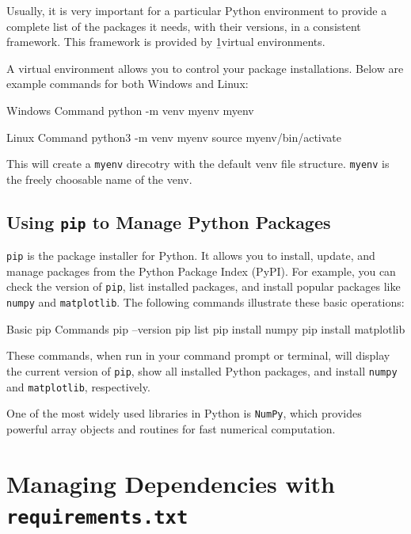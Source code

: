 Usually, it is very important for a particular Python environment to provide a complete list of the packages it needs, with their versions, in a consistent framework. This framework is provided by \b1{virtual environments}.

A virtual environment allows you to control your package installations. Below are example commands for both Windows and Linux:

\begin{codeonly}{Windows Command}
python -m venv myenv
myenv\Scripts\activate
\end{codeonly}

\begin{codeonly}{Linux Command}
python3 -m venv myenv
source myenv/bin/activate
\end{codeonly}

This will create a \texttt{myenv} direcotry with the default venv file structure. \texttt{myenv} is the freely choosable name of the venv.  

\subsection{Using \texttt{pip} to Manage Python Packages}

\noindent \texttt{pip} is the package installer for Python. It allows you to install, update, and manage packages from the Python Package Index (PyPI). For example, you can check the version of \texttt{pip}, list installed packages, and install popular packages like \texttt{numpy} and \texttt{matplotlib}. The following commands illustrate these basic operations:

\begin{codeonly}{Basic pip Commands}
pip --version
pip list
pip install numpy
pip install matplotlib
\end{codeonly}

\noindent These commands, when run in your command prompt or terminal, will display the current version of \texttt{pip}, show all installed Python packages, and install \texttt{numpy} and \texttt{matplotlib}, respectively.

One of the most widely used libraries in Python is \texttt{NumPy}, which provides powerful array objects and routines for fast numerical computation. 


%
\section{Managing Dependencies with \texttt{requirements.txt}}

